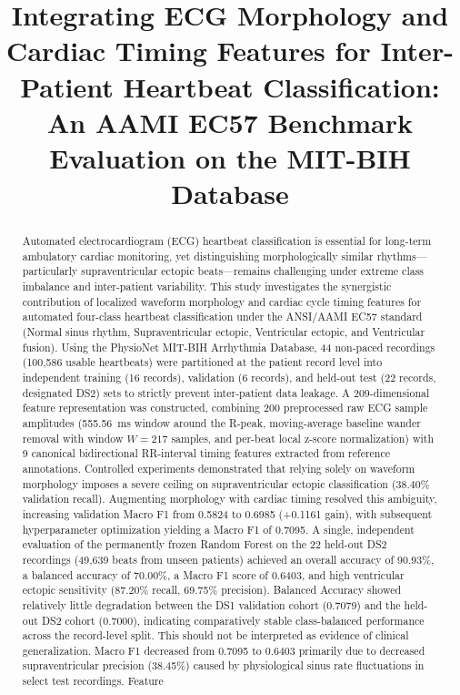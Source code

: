 \documentclass[conference]{IEEEtran}
\begin{document}
\title{Integrating ECG Morphology and Cardiac Timing Features for Inter-Patient Heartbeat Classification: An AAMI EC57 Benchmark Evaluation on the MIT-BIH Database}

\author{
}

\maketitle

\begin{abstract}
Automated electrocardiogram (ECG) heartbeat classification is essential for long-term ambulatory cardiac monitoring, yet distinguishing morphologically similar rhythms---particularly supraventricular ectopic beats---remains challenging under extreme class imbalance and inter-patient variability. This study investigates the synergistic contribution of localized waveform morphology and cardiac cycle timing features for automated four-class heartbeat classification under the ANSI/AAMI EC57 standard (Normal sinus rhythm, Supraventricular ectopic, Ventricular ectopic, and Ventricular fusion). Using the PhysioNet MIT-BIH Arrhythmia Database, 44 non-paced recordings (100,586 usable heartbeats) were partitioned at the patient record level into independent training (16 records), validation (6 records), and held-out test (22 records, designated DS2) sets to strictly prevent inter-patient data leakage. A 209-dimensional feature representation was constructed, combining 200 preprocessed raw ECG sample amplitudes (555.56~ms window around the R-peak, moving-average baseline wander removal with window $W=217$ samples, and per-beat local z-score normalization) with 9 canonical bidirectional RR-interval timing features extracted from reference annotations. Controlled experiments demonstrated that relying solely on waveform morphology imposes a severe ceiling on supraventricular ectopic classification (38.40\% validation recall). Augmenting morphology with cardiac timing resolved this ambiguity, increasing validation Macro F1 from 0.5824 to 0.6985 (+0.1161 gain), with subsequent hyperparameter optimization yielding a Macro F1 of 0.7095. A single, independent evaluation of the permanently frozen Random Forest on the 22 held-out DS2 recordings (49,639 beats from unseen patients) achieved an overall accuracy of 90.93\%, a balanced accuracy of 70.00\%, a Macro F1 score of 0.6403, and high ventricular ectopic sensitivity (87.20\% recall, 69.75\% precision). Balanced Accuracy showed relatively little degradation between the DS1 validation cohort (0.7079) and the held-out DS2 cohort (0.7000), indicating comparatively stable class-balanced performance across the record-level split. This should not be interpreted as evidence of clinical generalization. Macro F1 decreased from 0.7095 to 0.6403 primarily due to decreased supraventricular precision (38.45\%) caused by physiological sinus rate fluctuations in select test recordings. Feature 
\end{abstract}
\end{document}
